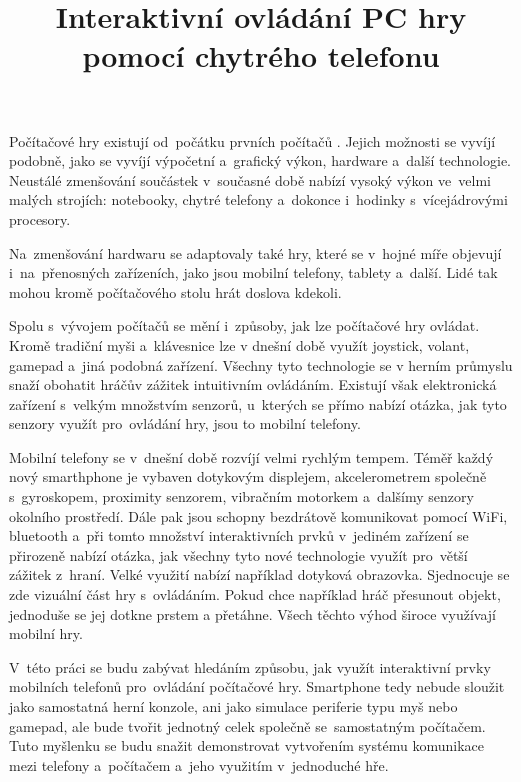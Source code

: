 \documentclass[thesis=B,czech,hidelinks]{FITthesis}[2012/06/26] %
\title{Interaktivn{\' i} ovl{\' a}d{\' a}n{\' i} PC hry pomoc{\' i} chytr{\' e}ho telefonu}
\begin{document}


\begin{introduction}

Počítačové hry existují od~počátku prvních počítačů \cite{rylich}. Jejich možnosti se vyvíjí podobně, jako se vyvíjí výpočetní a~grafický výkon, hardware a~další technologie. Neustálé zmenšování součástek v~současné době nabízí vysoký výkon ve~velmi malých strojích: notebooky, chytré telefony a~dokonce i~hodinky s~vícejádrovými procesory. \cite{kupi}

Na~zmenšování hardwaru se adaptovaly také hry, které se v~hojné míře objevují i~na~přenosných zařízeních, jako jsou mobilní telefony, tablety a~další. Lidé tak mohou kromě počítačového stolu hrát doslova kdekoli.

Spolu s~vývojem počítačů se mění i~způsoby, jak lze počítačové hry ovládat. Kromě tradiční myši a~klávesnice lze v dnešní době využít joystick, volant, gamepad a~jiná podobná zařízení. Všechny tyto technologie se v herním průmyslu snaží obohatit hráčův zážitek intuitivním ovládáním. Existují však elektronická zařízení s~velkým množstvím senzorů, u~kterých se přímo nabízí otázka, jak tyto senzory využít pro~ovládání hry, jsou to mobilní telefony.

Mobilní telefony se v~dnešní době rozvíjí velmi rychlým tempem. Téměř každý nový smarthphone je vybaven dotykovým displejem, akcelerometrem společně s~gyroskopem, proximity senzorem, vibračním motorkem a~dalšímy senzory okolního prostředí. Dále pak jsou schopny bezdrátově komunikovat pomocí WiFi, bluetooth a~při tomto množství interaktivních prvků v~jediném zařízení se přirozeně nabízí otázka, jak všechny tyto nové technologie využít pro~větší zážitek z~hraní. Velké využití nabízí například dotyková obrazovka. Sjednocuje se zde vizuální část hry s~ovládáním. Pokud chce například hráč přesunout objekt, jednoduše se jej dotkne prstem a přetáhne. Všech těchto výhod široce využívají mobilní hry.

V~této práci se budu zabývat hledáním způsobu, jak využít interaktivní prvky mobilních telefonů pro~ovládání počítačové hry. Smartphone tedy nebude sloužit jako samostatná herní konzole, ani jako simulace periferie typu myš nebo gamepad, ale bude tvořit jednotný celek společně se~samostatným počítačem. Tuto myšlenku se budu snažit demonstrovat vytvořením systému komunikace mezi telefony a~počítačem a~jeho využitím v~jednoduché hře. 


\end{introduction}
\end{document}

